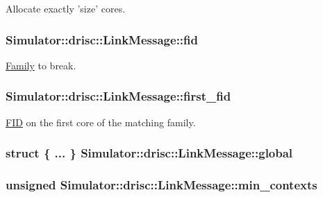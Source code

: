 Allocate exactly 'size' cores. 

\hypertarget{struct_simulator_1_1drisc_1_1_link_message_a37e30a9a8d7491b3ceb8ea32c2d9c336}{
\subsubsection[{fid}]{ Simulator\+::drisc\+::\+Link\+Message\+::fid}}\label{struct_simulator_1_1drisc_1_1_link_message_a37e30a9a8d7491b3ceb8ea32c2d9c336}


\hyperlink{struct_simulator_1_1drisc_1_1_family}{Family} to break. 

\hypertarget{struct_simulator_1_1drisc_1_1_link_message_a66931c60942bec7ca261587f68f4bf3c}{
\subsubsection[{first\+\_\+fid}]{ Simulator\+::drisc\+::\+Link\+Message\+::first\+\_\+fid}}\label{struct_simulator_1_1drisc_1_1_link_message_a66931c60942bec7ca261587f68f4bf3c}


\hyperlink{struct_simulator_1_1_f_i_d}{F\+I\+D} on the first core of the matching family. 

\hypertarget{struct_simulator_1_1drisc_1_1_link_message_ab33862b74a1e4cf5eaa05f84eb134c1d}{
\subsubsection[{global}]{\setlength{\rightskip}{0pt plus 5cm}struct \{ ... \}   Simulator\+::drisc\+::\+Link\+Message\+::global}}\label{struct_simulator_1_1drisc_1_1_link_message_ab33862b74a1e4cf5eaa05f84eb134c1d}
\hypertarget{struct_simulator_1_1drisc_1_1_link_message_a74392a3a738eefb31a377ccc4babb1ab}{
\subsubsection[{min\+\_\+contexts}]{\setlength{\rightskip}{0pt plus 5cm}unsigned Simulator\+::drisc\+::\+Link\+Message\+::min\+\_\+contexts}}\label{struct_simulator_1_1drisc_1_1_link_message_a74392a3a738eefb31a377ccc4babb1ab}


